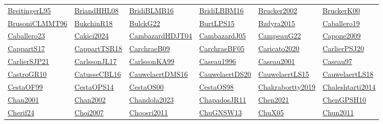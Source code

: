 \begin{longtable}{*{6}{l}}
\hyperref[detail:BreitingerL95]{BreitingerL95} & \hyperref[detail:BriandHHL08]{BriandHHL08} & \hyperref[detail:BridiBLMB16]{BridiBLMB16} & \hyperref[detail:BridiLBBM16]{BridiLBBM16} & \hyperref[detail:Brucker2002]{Brucker2002} & \hyperref[detail:BruckerK00]{BruckerK00}\\ 
\hyperref[detail:BrusoniCLMMT96]{BrusoniCLMMT96} & \hyperref[detail:BukchinR18]{BukchinR18} & \hyperref[detail:BulckG22]{BulckG22} & \hyperref[detail:BurtLPS15]{BurtLPS15} & \hyperref[detail:Bzdyra2015]{Bzdyra2015} & \hyperref[detail:Caballero19]{Caballero19}\\ 
\hyperref[detail:Caballero23]{Caballero23} & \hyperref[detail:Cakici2024]{Cakici2024} & \hyperref[detail:CambazardHDJT04]{CambazardHDJT04} & \hyperref[detail:CambazardJ05]{CambazardJ05} & \hyperref[detail:CampeauG22]{CampeauG22} & \hyperref[detail:Capone2009]{Capone2009}\\ 
\hyperref[detail:CappartS17]{CappartS17} & \hyperref[detail:CappartTSR18]{CappartTSR18} & \hyperref[detail:CarchraeB09]{CarchraeB09} & \hyperref[detail:CarchraeBF05]{CarchraeBF05} & \hyperref[detail:Caricato2020]{Caricato2020} & \hyperref[detail:CarlierPSJ20]{CarlierPSJ20}\\ 
\hyperref[detail:CarlierSJP21]{CarlierSJP21} & \hyperref[detail:CarlssonJL17]{CarlssonJL17} & \hyperref[detail:CarlssonKA99]{CarlssonKA99} & \hyperref[detail:Caseau1996]{Caseau1996} & \hyperref[detail:Caseau2001]{Caseau2001} & \hyperref[detail:Caseau97]{Caseau97}\\ 
\hyperref[detail:CastroGR10]{CastroGR10} & \hyperref[detail:CatusseCBL16]{CatusseCBL16} & \hyperref[detail:CauwelaertDMS16]{CauwelaertDMS16} & \hyperref[detail:CauwelaertDS20]{CauwelaertDS20} & \hyperref[detail:CauwelaertLS15]{CauwelaertLS15} & \hyperref[detail:CauwelaertLS18]{CauwelaertLS18}\\ 
\hyperref[detail:CestaOF99]{CestaOF99} & \hyperref[detail:CestaOPS14]{CestaOPS14} & \hyperref[detail:CestaOS00]{CestaOS00} & \hyperref[detail:CestaOS98]{CestaOS98} & \hyperref[detail:Chakrabortty2019]{Chakrabortty2019} & \hyperref[detail:Chaleshtarti2014]{Chaleshtarti2014}\\ 
\hyperref[detail:Chan2001]{Chan2001} & \hyperref[detail:Chan2002]{Chan2002} & \hyperref[detail:Chandola2023]{Chandola2023} & \hyperref[detail:ChapadosJR11]{ChapadosJR11} & \hyperref[detail:Chen2021]{Chen2021} & \hyperref[detail:ChenGPSH10]{ChenGPSH10}\\ 
\hyperref[detail:Cherif24]{Cherif24} & \hyperref[detail:Choi2007]{Choi2007} & \hyperref[detail:Choosri2011]{Choosri2011} & \hyperref[detail:ChuGNSW13]{ChuGNSW13} & \hyperref[detail:ChuX05]{ChuX05} & \hyperref[detail:Chun2011]{Chun2011}\\ 

\end{longtable}
